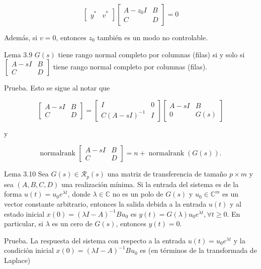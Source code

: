 \documentclass[11pt]{article}
\begin{document}
$$
\left[\begin{array}{ll}
y^{*} & v^{*}
\end{array}\right]\left[\begin{array}{cc}
A-z_{0} I & B \\
C & D
\end{array}\right]=0
$$

Además, si $v=0$, entonces $z_{0}$ también es un modo no controlable.

Lema 3.9 $G(s)$ tiene rango normal completo por columnas (filas) si y solo si $\left[\begin{array}{cc}A-s I & B \\ C & D\end{array}\right]$ tiene rango normal completo por columnas (filas).

Prueba. Esto se sigue al notar que

$$
\left[\begin{array}{cc}
A-s I & B \\
C & D
\end{array}\right]=\left[\begin{array}{cc}
I & 0 \\
C(A-s I)^{-1} & I
\end{array}\right]\left[\begin{array}{cc}
A-s I & B \\
0 & G(s)
\end{array}\right]
$$

y

$$
\text { normalrank }\left[\begin{array}{cc}
A-s I & B \\
C & D
\end{array}\right]=n+\operatorname{normalrank}(G(s)) \text {. }
$$

Lema 3.10 Sea $G(s) \in \mathcal{R}_{p}(s)$ una matriz de transferencia de tamaño $p \times m$ y sea $(A, B, C, D)$ una realización mínima. Si la entrada del sistema es de la forma $u(t)=u_{0} e^{\lambda t}$, donde $\lambda \in \mathbb{C}$ no es un polo de $G(s)$ y $u_{0} \in \mathbb{C}^{m}$ es un vector constante arbitrario, entonces la salida debida a la entrada $u(t)$ y al estado inicial $x(0)=(\lambda I-A)^{-1} B u_{0}$ es $y(t)=G(\lambda) u_{0} e^{\lambda t}, \forall t \geq 0$. En particular, si $\lambda$ es un cero de $G(s)$, entonces $y(t)=0$.

Prueba. La respuesta del sistema con respecto a la entrada $u(t)=u_{0} e^{\lambda t}$ y la condición inicial $x(0)=(\lambda I-A)^{-1} B u_{0}$ es (en términos de la transformada de Laplace)
\end{document}

